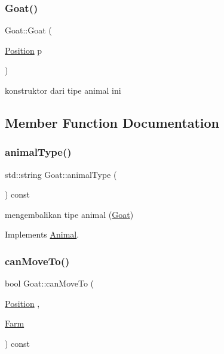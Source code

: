 \subsubsection{\texorpdfstring{Goat()}{Goat()}}
{\footnotesize\ttfamily Goat\+::\+Goat (\begin{DoxyParamCaption}\item[{\mbox{\hyperlink{class_position}{Position}}}]{p }\end{DoxyParamCaption})}

konstruktor dari tipe animal ini 

\subsection{Member Function Documentation}
\mbox{\label{class_goat_a664be0f59f9504a4f632ae79ac964cf5}} 
\subsubsection{\texorpdfstring{animalType()}{animalType()}}
{\footnotesize\ttfamily std\+::string Goat\+::animal\+Type (\begin{DoxyParamCaption}{ }\end{DoxyParamCaption}) const\hspace{0.3cm}{\ttfamily [virtual]}}

mengembalikan tipe animal (\mbox{\hyperlink{class_goat}{Goat}}) 

Implements \mbox{\hyperlink{class_animal_a1969cf8cf77a7900207420ae26f856e9}{Animal}}.

\mbox{\label{class_goat_a8c5441c13be5956b4d8381383a2783bb}} 
\subsubsection{\texorpdfstring{canMoveTo()}{canMoveTo()}}
{\footnotesize\ttfamily bool Goat\+::can\+Move\+To (\begin{DoxyParamCaption}\item[{\mbox{\hyperlink{class_position}{Position}}}]{,  }\item[{\mbox{\hyperlink{class_farm}{Farm}}}]{ }\end{DoxyParamCaption}) const\hspace{0.3cm}{\ttfamily [virtual]}}

